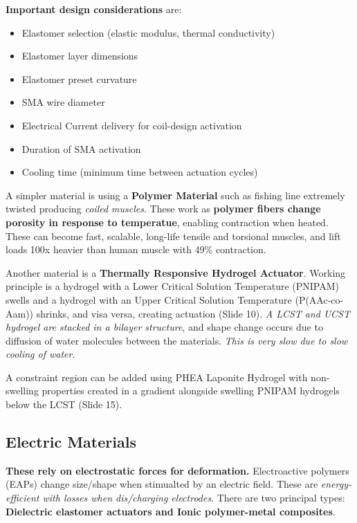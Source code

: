 \documentclass[onecolumn,a4paper]{article}
\begin{document}
\textbf{Important design considerations} are:
\begin{itemize}
    \item Elastomer selection (elastic modulus, thermal conductivity)
    \item Elastomer layer dimensions
    \item Elastomer preset curvature
    \item SMA wire diameter
    \item Electrical Current delivery for coil-design activation
    \item Duration of SMA activation
    \item Cooling time (minimum time between actuation cycles)
\end{itemize}

A simpler material is using a \textbf{Polymer Material} such as fishing line extremely twisted producing \emph{coiled muscles}. These work as \textbf{polymer fibers change porosity in response to temperatue}, enabling contraction when heated. These can become fast, scalable, long-life tensile and torsional muscles, and lift loads 100x heavier than human muscle with 49\% contraction.

Another material is a \textbf{Thermally Responsive Hydrogel Actuator}. Working principle is a hydrogel with a Lower Critical Solution Temperature (PNIPAM) swells and a hydrogel with an Upper Critical Solution Temperature (P(AAc-co-Aam)) shrinks, and visa versa, creating actuation (Slide 10). \emph{A LCST and UCST hydrogel are stacked in a bilayer structure}, and shape change occurs due to diffusion of water molecules between the materials. \emph{This is very slow due to slow cooling of water}.

A constraint region can be added using PHEA Laponite Hydrogel with non-swelling properties created in a gradient alongside  swelling PNIPAM hydrogels below the LCST (Slide 15).

\subsection{Electric Materials}
\textbf{These rely on electrostatic forces for deformation.} Electroactive polymers (EAPs) change size/shape when stimualted by an electric field. These are \emph{energy-efficient with losses when dis/charging electrodes}. There are two principal types: \textbf{Dielectric elastomer actuators and Ionic polymer-metal composites}.
\end{document}
